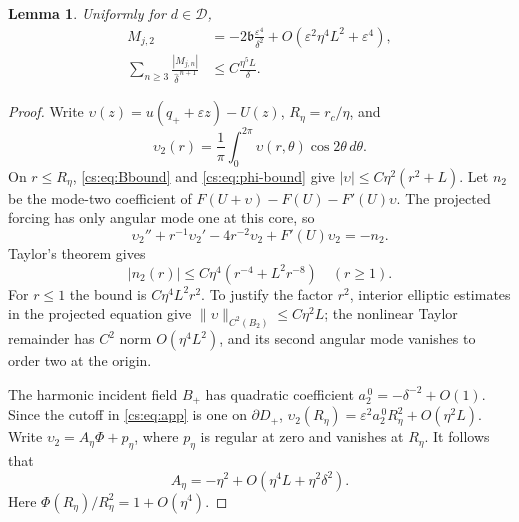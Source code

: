 \documentclass[11pt,reqno]{amsart}
\numberwithin{equation}{section}
\newtheorem{lemma}[theorem]{Lemma}
\theoremstyle{definition}
\theoremstyle{remark}
\newcommand{\eps}{\varepsilon}
\begin{document}
\begin{lemma}\label{cs:lem:moments}
Uniformly for $d\in\mathcal D$,
\begin{align}
 M_{j,2}&=-2\mathfrak b\frac{\eps^4}{\delta^2}
      +O\left(\eps^2\eta^4L^2+\eps^4\right),\label{cs:eq:secondmoment}\\
 \sum_{n\ge3}\frac{|M_{j,n}|}{\widehat\delta^{\,n+1}}
                       &\le C\frac{\eta^5L}{\delta}.\label{cs:eq:highermom}
\end{align}
\end{lemma}

\begin{proof}
Write $\upsilon(z)=u(q_++\eps z)-U(z)$, $R_\eta=r_c/\eta$, and
\[
 \upsilon_2(r)=\frac1\pi\int_0^{2\pi}\upsilon(r,\theta)\cos2\theta\,d\theta.
\]
On $r\le R_\eta$, \eqref{cs:eq:Bbound} and \eqref{cs:eq:phi-bound} give
\(|\upsilon|\le C\eta^2(r^2+L).\)
Let $n_2$ be the mode-two coefficient of
$F(U+\upsilon)-F(U)-F'(U)\upsilon$. The projected forcing has only angular mode one
at this core, so
\begin{equation}\label{cs:eq:mode2}
 \upsilon_2''+r^{-1}\upsilon_2'-4r^{-2}\upsilon_2+F'(U)\upsilon_2=-n_2 .
\end{equation}
Taylor's theorem gives
\begin{equation}\label{cs:eq:n2}
 |n_2(r)|\le C\eta^4(r^{-4}+L^2r^{-8})\quad(r\ge1).
\end{equation}
For $r\le1$ the bound is $C\eta^4L^2r^2$. To justify the factor
$r^2$, interior elliptic estimates in the projected equation give
$\|\upsilon\|_{C^2(B_2)}\le C\eta^2L$; the nonlinear Taylor remainder has
$C^2$ norm $O(\eta^4L^2)$, and its second angular mode vanishes to
order two at the origin.

The harmonic incident field $B_+$ has quadratic coefficient
\(a_2^{\,0}=-\delta^{-2}+O(1).\)
Since the cutoff in \eqref{cs:eq:app} is one on $\partial D_+$,
\(\upsilon_2(R_\eta)=\eps^2a_2^{\,0}R_\eta^2+O(\eta^2L).\)
Write $\upsilon_2=A_\eta\Phi+p_\eta$, where $p_\eta$ is regular at zero and
vanishes at $R_\eta$. It follows that
\begin{equation}\label{cs:eq:Aeta}
 A_\eta=-\eta^2+O(\eta^4L+\eta^2\delta^2).
\end{equation}
Here $\Phi(R_\eta)/R_\eta^2=1+O(\eta^4)$.


\end{proof}
\end{document}
